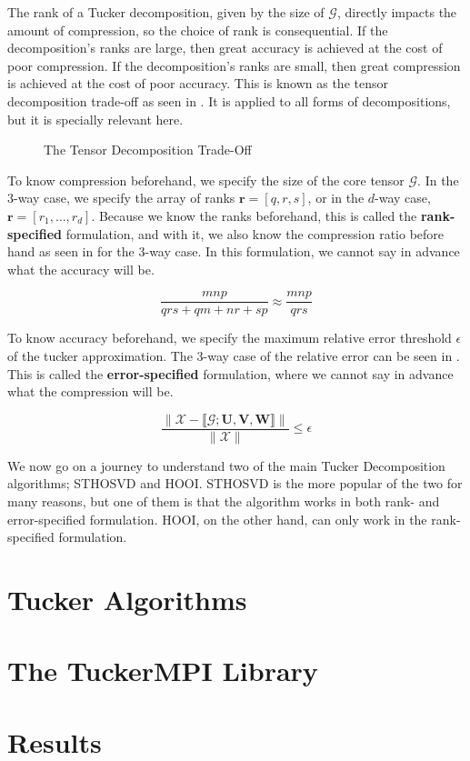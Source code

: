 
The rank of a Tucker decomposition, given by the size of $\mathcal{G}$, directly
impacts the amount of compression, so the choice of rank is consequential. If
the decomposition's ranks are large, then great accuracy is achieved at the cost
of poor compression. If the decomposition's ranks are small, then great
compression is achieved at the cost of poor accuracy. This is known as the
tensor decomposition trade-off as seen in
. It is applied to all forms of
decompositions, but it is specially relevant here. 

\begin{figure}[ht!]
    \centering
    
    \caption{The Tensor Decomposition Trade-Off}
    \label{fig:tensor_decomposition_trade_off}
\end{figure}

To know compression beforehand, we specify the size of the core tensor
$\mathcal{G}$. In the 3-way case, we specify the array of ranks $\mathbf{r} =
[q, r, s]$, or in the $d$-way case, $\mathbf{r} = [r_1, \hdots, r_d]$. Because
we know the ranks beforehand, this is called the \textbf{rank-specified}
formulation, and with it, we also know the compression ratio before hand as seen
in  for the 3-way case. In this formulation, we
cannot say in advance what the accuracy will be.

\begin{equation} \label{eq:compression_ratio}
    \frac{mnp}{qrs + qm + nr + sp} \approx \frac{mnp}{qrs}
\end{equation}

To know accuracy beforehand, we specify the maximum relative error threshold
$\epsilon$ of the tucker approximation. The 3-way case of the relative error can
be seen in . This is called the \textbf{error-specified}
formulation, where we cannot say in advance what the compression will be. 

\begin{equation} \label{eq:rel_error}
    \frac{\| \mathcal{X} - \llbracket \mathcal{G}; \mathbf{U, V, W} \rrbracket \|}{\|\mathcal{X}\|} \leq \epsilon
\end{equation}

We now go on a journey to understand two of the main Tucker Decomposition
algorithms; STHOSVD and HOOI. STHOSVD is the more popular of the two for many
reasons, but one of them is that the algorithm works in both rank- and
error-specified formulation. HOOI, on the other hand, can only work in the
rank-specified formulation. 


\section{Tucker Algorithms}
    

\section{The TuckerMPI Library}
    

\section{Results}
    